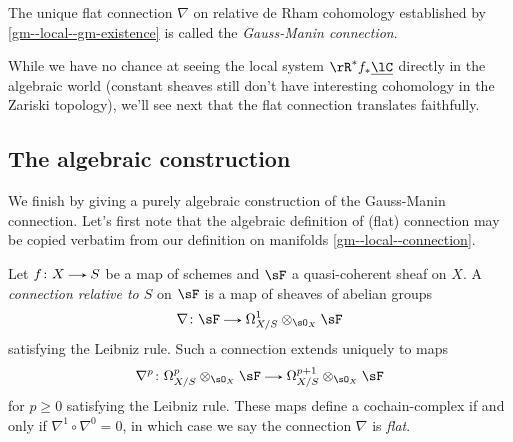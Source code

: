 \begin{definition}
  \label{gm--local--gm-name}
  The unique flat connection $\nabla$ on relative de Rham cohomology established by \cref{gm--local--gm-existence} is called the \emph{Gauss-Manin connection}.
\end{definition}

While we have no chance at seeing the local system $\rR^*f_*\u\lC$ directly in the algebraic world (constant sheaves still don't have interesting cohomology in the Zariski topology), we'll see next that the flat connection translates faithfully.


\subsection{The algebraic construction}
\label{gm--construction}

We finish by giving a purely algebraic construction of the Gauss-Manin connection. Let's first note that the algebraic definition of (flat) connection may be copied verbatim from our definition on manifolds \cref{gm--local--connection}.

\begin{definition}
  \label{gm--construction--connection}
  Let $f \c X \to S$ be a map of schemes and $\sF$ a quasi-coherent sheaf on $X$. A \emph{connection relative to $S$} on $\sF$ is a map of sheaves of abelian groups
  \[
    \nabla \c \sF \to \Omega_{X/S}^1 \otimes_{\sO_X} \sF
  \]
  satisfying the Leibniz rule. Such a connection extends uniquely to maps
  \[
    \nabla^p \c \Omega_{X/S}^p \otimes_{\sO_X} \sF \to \Omega_{X/S}^{p+1} \otimes_{\sO_X} \sF 
  \]
  for $p \ge 0$ satisfying the Leibniz rule. These maps define a cochain-complex if and only if $\nabla^1 \circ \nabla^0 = 0$, in which case we say the connection $\nabla$ is \emph{flat}.
\end{definition}

